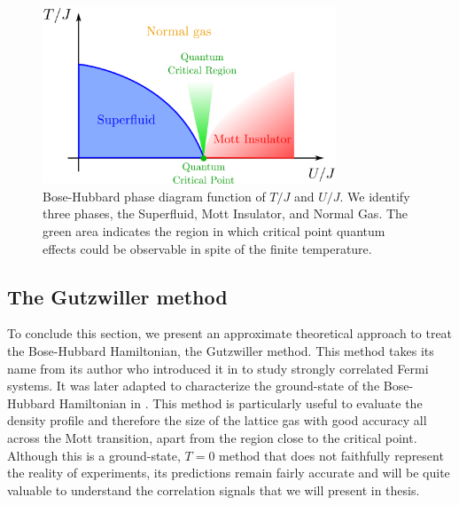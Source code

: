 \begin{figure}
    \centering
    \includegraphics[width=0.78\textwidth]{Fig/Chapter2/phase_diagram.png}
    \caption[Bose-Hubbard phase diagram function of $T/J$ and $U/J$]{Bose-Hubbard phase diagram function of $T/J$ and $U/J$. We identify three phases, the Superfluid, Mott Insulator, and Normal Gas. The green area indicates the region in which critical point quantum effects could be observable in spite of the finite temperature.}
    \label{fig:phase_diagram}
\end{figure}



\subsection{The Gutzwiller method}

To conclude this section, we present an approximate theoretical approach to treat the Bose-Hubbard Hamiltonian, the Gutzwiller method. This method takes its name from its author who introduced it in \cite{gutzwiller1963effect} to study strongly correlated Fermi systems. It was later adapted to characterize the ground-state of the Bose-Hubbard Hamiltonian in \cite{rokhsar1991gutzwiller}. This method is particularly useful to evaluate the density profile and therefore the size of the lattice gas with good accuracy all across the Mott transition, apart from the region close to the critical point. Although this is a ground-state, $T=0$ method that does not faithfully represent the reality of experiments, its predictions remain fairly accurate and will be quite valuable to understand the correlation signals that we will present in thesis.

